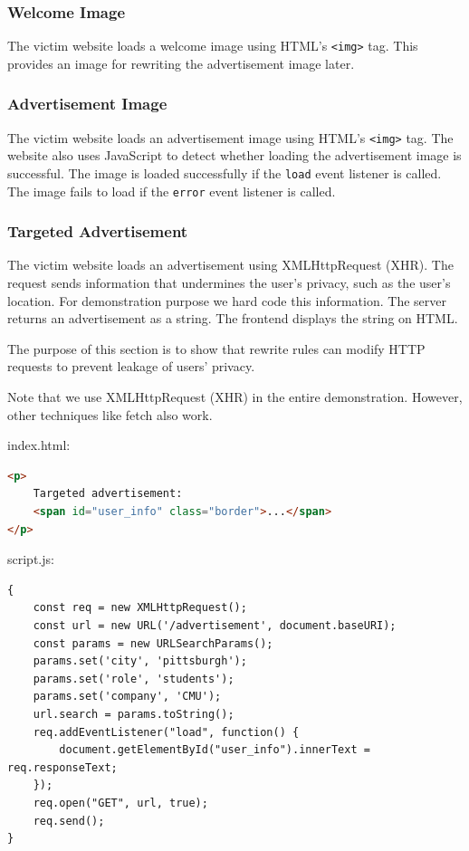 \documentclass[conference]{IEEEtran}
\begin{document}
\subsubsection{Welcome Image}

The victim website loads a welcome image using HTML's \lstinline{<img>} tag. This provides an image for rewriting the advertisement image later.

\subsubsection{Advertisement Image}

The victim website loads an advertisement image using HTML's \lstinline{<img>} tag. The website also uses JavaScript to detect whether loading the advertisement image is successful. The image is loaded successfully if the \lstinline{load} event listener is called. The image fails to load if the \lstinline{error} event listener is called.

\subsubsection{Targeted Advertisement}

The victim website loads an advertisement using XMLHttpRequest (XHR). The request sends information that undermines the user's privacy, such as the user's location. For demonstration purpose we hard code this information. The server returns an advertisement as a string. The frontend displays the string on HTML.

The purpose of this section is to show that rewrite rules can modify HTTP requests to prevent leakage of users' privacy.

Note that we use XMLHttpRequest (XHR) in the entire demonstration. However, other techniques like fetch also work.

index.html:
\begin{lstlisting}[language=HTML]
<p>
    Targeted advertisement:
    <span id="user_info" class="border">...</span>
</p>
\end{lstlisting}

script.js:
\begin{lstlisting}
{
	const req = new XMLHttpRequest();
	const url = new URL('/advertisement', document.baseURI);
	const params = new URLSearchParams();
	params.set('city', 'pittsburgh');
	params.set('role', 'students');
	params.set('company', 'CMU');
	url.search = params.toString();
	req.addEventListener("load", function() {
		document.getElementById("user_info").innerText = req.responseText;
	});
	req.open("GET", url, true);
	req.send();
}
\end{lstlisting}
\end{document}
